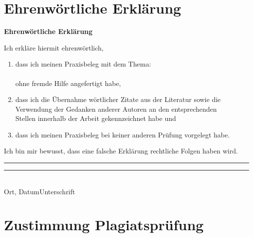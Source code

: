 \cleardoublepage
\section{Ehrenwörtliche Erklärung}
    \vspace*{1cm}
    \begin{center}
        \huge\textbf{Ehrenwörtliche Erklärung}\\
    \end{center}
    \vspace*{1cm}
    \normalsize
    Ich erkläre hiermit ehrenwörtlich,

    \begin{enumerate}
        \vspace{1cm}
        \item dass ich meinen Praxisbeleg mit dem Thema:\\

        \textbf{\TextField[width=\columnwidth,multiline=true, height=2cm, name=Thema]{} }\\

        ohne fremde Hilfe angefertigt habe,
        \item dass ich die Übernahme wörtlicher Zitate aus der Literatur sowie die\\
        Verwendung der Gedanken anderer Autoren an den entsprechenden\\
        Stellen innerhalb der Arbeit gekennzeichnet habe und
        \item dass ich meinen Praxisbeleg bei keiner anderen Prüfung vorgelegt habe.\\[1,5cm]
    \end{enumerate}
    Ich bin mir bewusst, dass eine falsche Erklärung rechtliche Folgen haben wird.\\[1,5cm]

    \rule{0.35\columnwidth}{0.4pt}\hspace{0.05\columnwidth}\rule{0.55\columnwidth}{0.4pt}\\
    Ort, Datum\hspace{0.27\columnwidth}Unterschrift

    \newpage
\section{Zustimmung Plagiatsprüfung}

